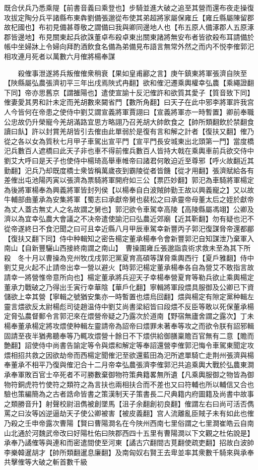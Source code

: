 既合伏兵乃悉乘隄【前書音義曰乘登也】步騎並進大破之追至其營而還布夜走操復攻拔定陶分兵平諸縣布東犇劉備張邈從布使其弟超將家屬保雍丘【雍丘縣屬陳留郡故杞國也】布初見備甚尊敬之謂備曰我與卿同邊地人也【布五原人備涿郡人五原涿郡皆邊地】布見關東起兵欲誅董卓布殺卓東出關東諸將無安布者皆欲殺布耳請備於帳中坐婦牀上令婦向拜酌酒飲食名備為弟備見布語言無常外然之而内不悦李傕郭汜相攻連月死者以萬數六月傕將楊奉謀

　　殺傕事泄遂將兵叛傕傕衆稍衰【果如皇甫酈之言】庚午鎮東將軍張濟自陜至【陜縣屬弘農張濟初平三年出戌焉陜式冉翻】欲和傕汜遷乘輿權幸弘農【乘繩證翻下同】帝亦思舊京【謂雒陽也】遣使宣諭十反汜傕許和欲質其愛子【質音致下同】傕妻愛其男和計未定而羌胡數來闚省門【數所角翻】曰天子在此中邪李將軍許我宫人今皆何在帝患之使侍中劉艾謂宣義將軍賈詡曰【宣義將軍亦一時暫置】卿前奉職公忠故仍升榮寵今羌胡滿路宜思方略詡乃召羌胡大帥飲食之【帥所類翻飲於禁翻食讀曰飤】許以封賞羌胡皆引去傕由此單弱於是復有言和解之計者【復扶又翻】傕乃從之各以女為質秋七月甲子車駕出宣平門【宣平門長安城東出北頭第一門】當度橋汜兵數百人遮橋曰此天子非也車不得前傕兵數百人皆持大戟在乘輿車前兵欲交侍中劉艾大呼曰是天子也使侍中楊琦高舉車帷帝曰諸君何敢迫近至尊邪【呼火故翻近其勤翻】汜兵乃却既度橋士衆皆稱萬歲夜到霸陵從者皆饑【從才用翻】張濟賦給各有差傕出屯池陽丙寅以張濟為票騎將軍開府如三公【票匹妙翻】郭汜為車騎將軍楊定為後將軍楊奉為興義將軍皆封列侯【以楊奉自白波賊帥勤王故以興義寵之】又以故牛輔部曲董承為安集將軍【蜀志曰承獻帝舅也裴松之曰承靈帝母董太后之姪於獻帝為丈人蓋古無丈人之名故謂之舅也】郭汜欲令車駕幸高陵【高陵縣屬馮翊】公卿及濟以為宜幸弘農大會議之不决帝遣使諭汜曰弘農近郊廟【近其靳翻】勿有疑也汜不從帝遂終日不食汜聞之曰可且幸近縣八月甲辰車駕幸新豐丙子郭汜復謀脅帝還都郿【復扶又翻下同】侍中种輯知之密告楊定董承楊奉令會新豐郭汜自知謀泄乃棄軍入南山【自新豐驪山西接終南謂之南山】　曹操圍雍丘張邈詣袁術求救未至為其下所殺　冬十月以曹操為兖州牧戊戌郭汜黨夏育高碩等謀脅乘輿西行【夏戶雅翻】侍中劉艾見火起不止請帝出幸一營以避火【時郭汜楊定董承楊奉各自為營艾不敢指言故請幸一將營惟帝意所向也】楊定董承將兵迎天子幸楊奉營夏育等勒兵欲止乘輿楊定董承力戰破之乃得出壬寅行幸華陰【華戶化翻】寧輯將軍段煨具服御及公卿已下資儲欲上幸其營【寧輯之號猶安集亦一時暫置也煨烏回翻】煨與楊定有隙定黨种輯左靈言煨欲反太尉楊彪司徒趙温侍中劉艾尚書梁紹皆曰段煨不反臣等敢以死保董承楊定脅弘農督郵令言郭汜來在煨營帝疑之乃露次於道南【野宿無廬舍謂之露次】丁未楊奉董承楊定將攻煨使种輯左靈請帝為詔帝曰煨罪未著奉等攻之而欲令朕有詔邪輯固請至夜半猶弗聽奉等乃輒攻煨營十餘日不下煨供給御膳稟贍百官無有二意【贍而艶翻】詔使侍中尚書告諭定等令與煨和解定等奉詔還營李傕郭汜悔令車駕東聞定攻煨相招共救之因欲劫帝而西楊定聞傕汜至欲還藍田為汜所遮單騎亡走荆州張濟與楊奉董承不相平乃復與傕汜合十二月帝幸弘農張濟李傕郭汜共追乘輿大戰於弘農東澗承奉軍敗百官士卒死者不可勝數棄御物符策典籍畧無所遺【凡乘輿服御之物皆為御物符銅虎符竹使符之類符之為言扶也兩相扶合而不差也又曰符輔也所以輔信又合也驗也策編簡為之古者誥命皆書之策漢制天子策書長二尺典籍内府圖籍及尚書中故事之類勝音升】射聲校尉沮儁被創墜馬【沮子余翻創初良翻】傕謂左右曰尚可活否儁罵之曰汝等凶逆逼劫天子使公卿被害【被皮義翻】宫人流離亂臣賊子未有如此也傕乃殺之壬申帝露次曹陽【賢曰曹陽澗名在今陜州西南七里俗謂之七里澗崔皓云自南山北通於河魏武帝改曰好陽杜佑曰陜郡西四十五里有曹陽澗以下文觀之杜佑說是】承奉乃譎傕等與連和而密遣間使至河東【譎古穴翻間古莧翻使疏吏翻】招故白波帥李樂韓暹胡才【帥所類翻暹息廉翻】及南匈奴右賢王去卑並率其衆數千騎來與承奉共擊傕等大破之斬首數千級